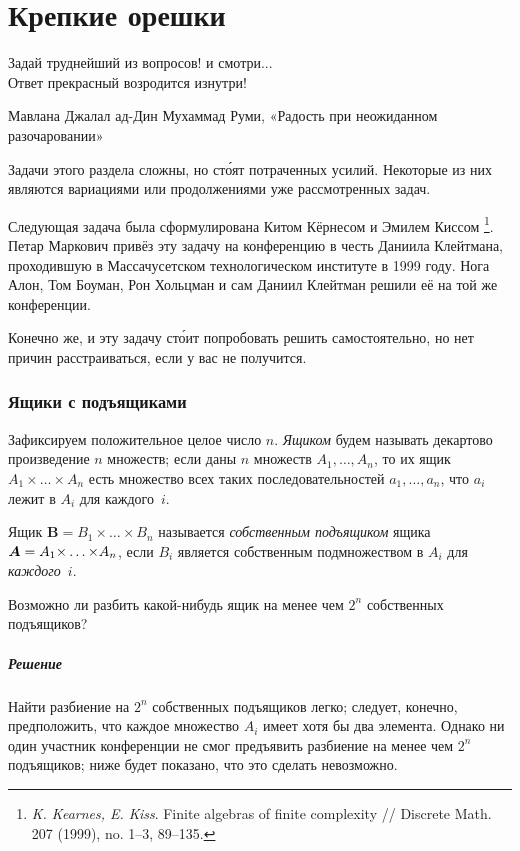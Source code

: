 \documentclass[twoside]{book}
\makeatletter
\newcommand{\rindex}[2][\imki@jobname]{%
  \index[#1]{\detokenize{#2}}%
}
\makeatother
\begin{document}

\chapter{Крепкие орешки}

\setlength{\epigraphwidth}{.55\textwidth}
\epigraph{Задай  труднейший  из  вопросов!  и  смотри...\\
Ответ  прекрасный  возродится  изнутри!\vspace{1ex}}{Мавлана Джалал ад-Дин Мухаммад Руми, «Радость   при   неожиданном разочаровании»
}

Задачи этого раздела сложны, но ст\'{о}ят потраченных усилий.
Некоторые из них являются вариациями или продолжениями уже рассмотренных задач.

\medskip

Следующая задача была сформулирована
Китом Кёрнесом %
и Эмилем Киссом%
\footnote{\emph{K. Kearnes, E. Kiss}. Finite algebras of finite complexity /\!/ {Discrete Math.} 207 (1999), no. 1--3, 89--135.}.
Петар Маркович привёз эту задачу на конференцию в честь Даниила Клейтмана, проходившую в Массачусетском технологическом институте в 1999 году.
Нога Алон, Том Боуман, Рон Хольцман и сам Даниил Клейтман решили её на той же конференции.

Конечно же, и эту задачу ст\'{о}ит попробовать решить самостоятельно, но нет причин расстраиваться, если у вас не получится.

\subsection*{Ящики с подъящиками}
\rindex{Ящики с подъящиками}

Зафиксируем положительное целое число $n$.
\emph{Ящиком} будем называть декартово произведение $n$ множеств;
если даны $n$ множеств $A_1,\dots,A_n$, то их ящик $A_1{\times}\dots{\times}A_n$ есть множество всех таких последовательностей $a_1,\dots,a_n$, что $a_i$ лежит в $A_i$ для каждого~$i$.

Ящик $\bm{B}=B_1{\times}\dots{\times}B_n$ называется \emph{собственным подъящиком} ящика $\bm{A}\z=A_1{\times}\z\dots{\times}A_n$, если $B_i$ является собственным подмножеством в $A_i$ для \emph{каждого}~$i$.

Возможно ли разбить какой-нибудь ящик на менее чем $2^n$ собственных подъящиков?

\paragraph{Решение}
Найти разбиение на $2^n$ собственных подъящиков легко; следует, конечно, предположить, что каждое множество $A_i$ имеет хотя бы два элемента.
Однако ни один участник конференции не смог предъявить разбиение на менее чем $2^n$ подъящиков; ниже будет показано, что это сделать невозможно.
\end{document}
